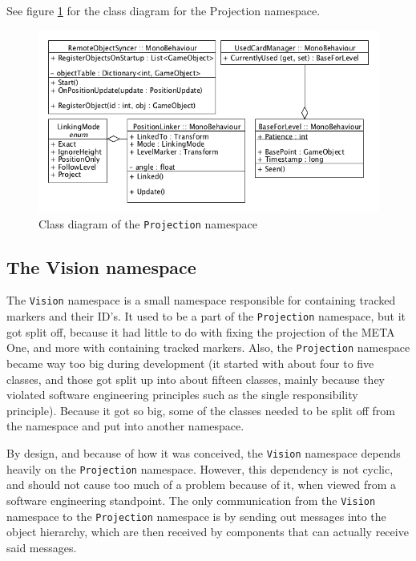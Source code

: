 			See figure \ref{fig:classdiagramprojection} for the class diagram for 
			the Projection namespace.
			
			\begin{figure}[ht]
				\includegraphics[width=\textwidth]{ClassDiagramProjection}
				\caption{Class diagram of the \texttt{Projection} namespace}
				\label{fig:classdiagramprojection}
			\end{figure}
			
		\subsection{The Vision namespace} \label{ssec:visionnamespace}
			The \texttt{Vision} namespace is a small namespace responsible for
			containing tracked markers and their ID's. It used to be a part
			of the \texttt{Projection} namespace, but it got split off,
			because it had little to do with fixing the projection of the
			META One, and more with containing tracked markers. Also, the
			\texttt{Projection} namespace became way too big during development
			(it started with about four to five classes, and those got split
			up into about fifteen classes, mainly because they violated software
			engineering principles such as the single responsibility principle).
			Because it got so big, some of the classes needed to be split off from
			the namespace and put into another namespace.
			
			By design, and because of how it was conceived, the \texttt{Vision} 
			namespace depends heavily on the \texttt{Projection} namespace.
			However, this dependency is not cyclic, and should not cause too
			much of a problem because of it, when viewed from a software
			engineering standpoint. The only communication from the \texttt{Vision}
			namespace to the \texttt{Projection} namespace is by sending out
			messages into the object hierarchy, which are then received by 
			components that can actually receive said messages. 
			
